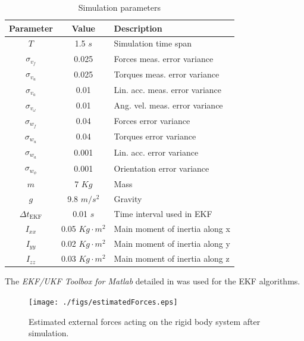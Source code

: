 \documentclass[letterpaper, 10 pt, conference]{ieeeconf}  %
\begin{document}
\begin{table}[h]
\caption{Simulation parameters}
\centering
\begin{tabular}{ccl}
\hline \hline
Parameter                   & Value        & Description \\ \hline \hline
$T$                         & 1.5 $s$      & Simulation time span\\
$\sigma_{v_f}$              & 0.025        & Forces meas. error variance\\
$\sigma_{v_u}$              & 0.025        & Torques meas. error variance \\
$\sigma_{v_a}$              & 0.01         & Lin. acc. meas. error variance\\
$\sigma_{v_{\omega}}$       & 0.01         & Ang. vel. meas. error variance\\
$\sigma_{w_f}$              & 0.04         & Forces error variance\\
$\sigma_{w_u}$              & 0.04         & Torques error variance\\
$\sigma_{w_a}$              & 0.001        & Lin. acc. error variance\\
$\sigma_{w_{\phi}}$         & 0.001        & Orientation error variance \\ 
$m$                         & 7 $Kg$       & Mass \\ 
$g$                         & 9.8 $m/s^2$  & Gravity\\ 
$\Delta t_{\textrm{EKF}}$   & 0.01 $s$     & Time interval used in EKF\\
$I_{xx}$                    & 0.05 $Kg \cdot m^2$& Main moment of inertia along x \\ 
$I_{yy}$                    & 0.02 $Kg \cdot m^2$& Main moment of inertia along y \\
$I_{zz}$                    & 0.03 $Kg \cdot m^2$& Main moment of inertia along z \\
\hline
\end{tabular}
\label{table:simuParams}
\end{table} 

The \emph{EKF/UKF Toolbox for Matlab} detailed in \cite{ekfToolbox} was used for the EKF algorithms.

\begin{figure}[t!]
 \centering
 \texttt{[image: ./figs/estimatedForces.eps]}
 \caption{Estimated external forces acting on the rigid body system after simulation.}
 \label{fig:estimatedForces}
\end{figure}
\end{document}
